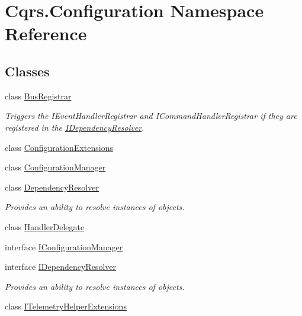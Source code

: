 \hypertarget{namespaceCqrs_1_1Configuration}{}\section{Cqrs.\+Configuration Namespace Reference}
\label{namespaceCqrs_1_1Configuration}
\subsection*{Classes}
\begin{DoxyCompactItemize}
\item 
class \hyperlink{classCqrs_1_1Configuration_1_1BusRegistrar}{Bus\+Registrar}
\begin{DoxyCompactList}\small\item\em Triggers the I\+Event\+Handler\+Registrar and I\+Command\+Handler\+Registrar if they are registered in the \hyperlink{interfaceCqrs_1_1Configuration_1_1IDependencyResolver}{I\+Dependency\+Resolver}. \end{DoxyCompactList}\item 
class \hyperlink{classCqrs_1_1Configuration_1_1ConfigurationExtensions}{Configuration\+Extensions}
\item 
class \hyperlink{classCqrs_1_1Configuration_1_1ConfigurationManager}{Configuration\+Manager}
\item 
class \hyperlink{classCqrs_1_1Configuration_1_1DependencyResolver}{Dependency\+Resolver}
\begin{DoxyCompactList}\small\item\em Provides an ability to resolve instances of objects. \end{DoxyCompactList}\item 
class \hyperlink{classCqrs_1_1Configuration_1_1HandlerDelegate}{Handler\+Delegate}
\item 
interface \hyperlink{interfaceCqrs_1_1Configuration_1_1IConfigurationManager}{I\+Configuration\+Manager}
\item 
interface \hyperlink{interfaceCqrs_1_1Configuration_1_1IDependencyResolver}{I\+Dependency\+Resolver}
\begin{DoxyCompactList}\small\item\em Provides an ability to resolve instances of objects. \end{DoxyCompactList}\item 
class \hyperlink{classCqrs_1_1Configuration_1_1ITelemetryHelperExtensions}{I\+Telemetry\+Helper\+Extensions}
\end{DoxyCompactItemize}
